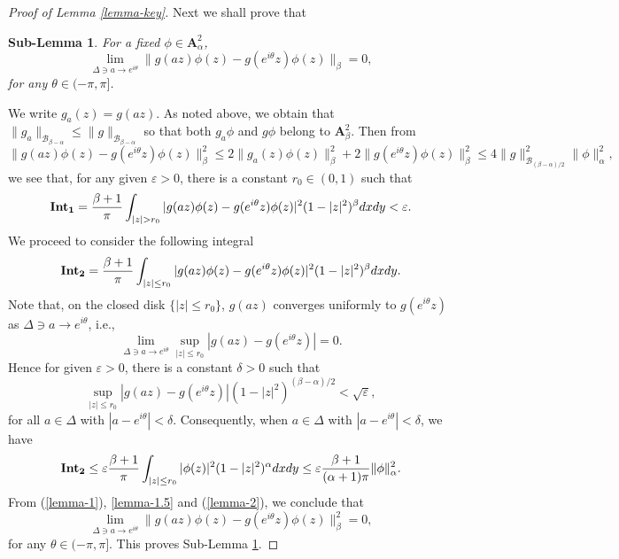\documentclass[10pt]{amsart}
\newtheorem{sub-lemma}[theorem]{Sub-Lemma}
\theoremstyle{definition}    %
\numberwithin{equation}{section}
\begin{document}
\begin{proof}[Proof of Lemma \ref{lemma-key}]
Next we shall prove that
\begin{sub-lemma}\label{sub-2}
For a fixed $\phi \in \mathbf{A}_{\alpha}^2$,  $$
\lim_{\Delta \ni a \to e^{i\theta}} \| g(a z)\phi(z) - g(e^{i\theta}z)\phi(z) \|_{\beta} = 0,$$
for any $\theta \in (-\pi,\pi]$.
\end{sub-lemma}  
We write $g_a(z)=g(az)$. As noted above, we obtain that $\|g_a\|_{\mathcal{B}_{\beta-\alpha}}\leq \|g\|_{\mathcal{B}_{\beta-\alpha}}$ so that both $g_a\phi$ and $g\phi$ belong to $\mathbf{A}_{\beta}^2$.  Then from 
\begin{equation} 
\| g(a z)\phi(z) - g(e^{i\theta}z)\phi(z) \|_{\beta}^2 \leq 2\|g_a(z)\phi(z)\|_{\beta}^2+2\|g(e^{i\theta}z)\phi(z)\|_{\beta}^2\leq 4 \|g\|_{\mathcal{B}_{(\beta-\alpha)/2}}^2 \|\phi\|_{\alpha}^2, \nonumber 
\end{equation}
we see that, for any given $\varepsilon>0$, there is a constant $r_0\in (0,1)$ such that
\begin{equation}\label{lemma-1}
{\bf Int_{1}}=\frac{\beta+1}{\pi}\int_{|z|>r_0}|g(a z)\phi(z) - g(e^{i\theta}z)\phi(z)|^{2}(1-|z|^2)^{\beta}dxdy<\varepsilon. 
\end{equation}
We proceed to consider the following integral
\begin{equation}\label{lemma-1.5}
{\bf Int_{2}}=\frac{\beta+1}{\pi}\int_{|z|\leq r_0}|g(a z)\phi(z) - g(e^{i\theta}z)\phi(z)|^{2}(1-|z|^2)^{\beta}dxdy. 
\end{equation}
Note that, on the closed disk $\{ |z| \leq r_0 \}$, $g(az)$ converges uniformly to $g(e^{i\theta}z)$ as $\Delta \ni a \to e^{i\theta}$, i.e.,
$$
\lim_{\Delta \ni a \to e^{i\theta}} \sup_{|z| \leq r_0} |g(az)-g(e^{i\theta}z)| = 0.
$$
Hence for given $\varepsilon>0$, there is a constant $\delta>0$ such that  $$
\sup_{|z| \leq r_0} |g(az)-g(e^{i\theta}z)|(1-|z|^2)^{(\beta-\alpha)/2}<\sqrt{\varepsilon},
$$
for all $a\in \Delta$ with $|a-e^{i\theta}|<\delta$.  Consequently, when $a\in \Delta$ with $|a-e^{i\theta}|<\delta$, we have 
\begin{equation}\label{lemma-2}
{\bf Int_{2}}\leq {\varepsilon} \frac{\beta+1}{\pi} \int_{|z|\leq r_0}|\phi(z)|^{2}(1-|z|^2)^{\alpha}dxdy\leq {\varepsilon} \frac{\beta+1}{(\alpha+1)\pi}\|\phi\|_{\alpha}^2.
\end{equation}
From (\ref{lemma-1}), \ref{lemma-1.5} and (\ref{lemma-2}), we conclude that $$
\lim_{\Delta \ni a \to e^{i\theta}} \| g(a z)\phi(z) - g(e^{i\theta}z)\phi(z) \|_{\beta}^2 = 0,$$
for any $\theta \in (-\pi,\pi]$. This proves Sub-Lemma \ref{sub-2}. 


\end{proof}
\end{document}
